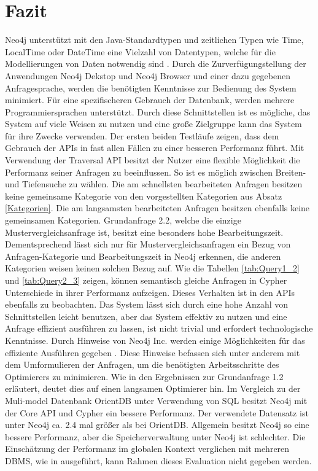 \section{Fazit}
Neo4j unterstützt mit den Java-Standardtypen und  zeitlichen Typen wie Time, LocalTime oder DateTime eine Vielzahl von Datentypen, welche für die Modellierungen von Daten notwendig sind \parencite{Types}. Durch die Zurverfügungstellung der Anwendungen Neo4j Dekstop und Neo4j Browser und einer dazu gegebenen Anfragesprache, werden die benötigten Kenntnisse zur Bedienung des System minimiert. Für eine spezifischeren Gebrauch der Datenbank, werden mehrere Programmiersprachen unterstützt. Durch diese Schnittstellen ist es mögliche, das System auf viele Weisen zu nutzen und eine große Zielgruppe kann das System für ihre Zwecke verwenden. \newline 
Der ersten beiden Testläufe zeigen, dass dem Gebrauch der APIs in fast allen Fällen zu einer besseren Performanz führt. Mit Verwendung der Traversal API besitzt der Nutzer eine flexible Möglichkeit die Performanz seiner Anfragen zu beeinflussen. So ist es möglich zwischen Breiten- und Tiefensuche zu wählen. Die am schnellsten bearbeiteten Anfragen besitzen keine gemeinsame Kategorie von den vorgestellten Kategorien aus Absatz \ref{Kategorien}. Die am langsamsten bearbeiteten Anfragen besitzen ebenfalls keine gemeinsamen Kategorien. Grundanfrage 2.2, welche die einzige Mustervergleichsanfrage ist, besitzt eine besonders hohe Bearbeitungszeit. Dementsprechend lässt sich nur für Mustervergleichsanfragen ein Bezug von Anfragen-Kategorie und Bearbeitungszeit in Neo4j erkennen, die anderen Kategorien weisen keinen solchen Bezug auf. \newline
Wie die Tabellen \ref{tab:Query1_2} und \ref{tab:Query2_3} zeigen, können semantisch gleiche Anfragen in Cypher Unterschiede in ihrer Performanz aufzeigen. Dieses Verhalten ist in den APIs ebenfalls zu beobachten. Das System lässt sich durch eine hohe Anzahl von Schnittstellen leicht benutzen, aber das System effektiv zu nutzen und eine Anfrage effizient ausführen zu lassen, ist nicht trivial und erfordert technologische Kenntnisse. Durch Hinweise von Neo4j Inc. werden einige Möglichkeiten für das effiziente Ausführen gegeben \parencite{Optimizer}. Diese Hinweise befassen sich unter anderem mit dem Umformulieren der Anfragen, um die benötigten Arbeitsschritte des Optimierers zu minimieren. Wie in den Ergebnissen zur Grundanfrage 1.2 erläutert, deutet dies auf einen langsamen Optimierer hin. \newline
Im Vergleich zu der Muli-model Datenbank OrientDB unter Verwendung von SQL besitzt Neo4j mit der Core API und Cypher ein bessere Performanz. Der verwendete Datensatz ist unter Neo4j ca. 2.4 mal größer als bei OrientDB. Allgemein besitzt Neo4j so eine bessere Performanz, aber die Speicherverwaltung unter Neo4j ist schlechter. Die Einschätzung der Performanz im globalen Kontext verglichen mit mehreren DBMS, wie in \parencite{jouili2013empirical} ausgeführt, kann Rahmen dieses Evaluation nicht gegeben werden. 

